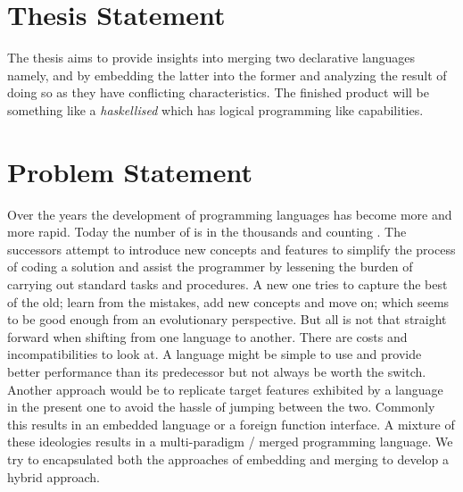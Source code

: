 \documentclass[thesis-solanki.tex]{subfiles}
\begin{document}
\section{Thesis Statement}

The thesis aims to provide insights into merging two declarative languages namely,  and
 by embedding the latter into the former and analyzing the result of doing so as they have
conflicting characteristics.
The finished product will be something like a \textit{haskellised}  which has logical programming
like capabilities.


\section{Problem Statement}

Over the years the development of programming languages has become more and more rapid.
Today the number of is in the thousands and counting \cite{website:timelineproglangwiki,
  website:historyofproglang}.
The successors attempt to introduce new concepts and features to simplify the process of coding a solution and
assist the programmer by lessening the burden of carrying out standard tasks and procedures.
A new one tries to capture the best of the old; learn from the mistakes, add new concepts and move on; which seems
to be good enough from an evolutionary perspective.
But all is not that straight forward when shifting from one language to another.
There are costs and incompatibilities to look at.
A language might be simple to use and provide better performance than its predecessor but not always be worth the
switch.
Another approach would be to replicate target features exhibited by a language in the present one to avoid the
hassle of jumping between the two.
Commonly this results in an embedded language or a foreign function interface.
A mixture of these ideologies results in a multi-paradigm / merged programming language.
We try to encapsulated both the approaches of embedding and merging to develop a hybrid approach.
\end{document}
